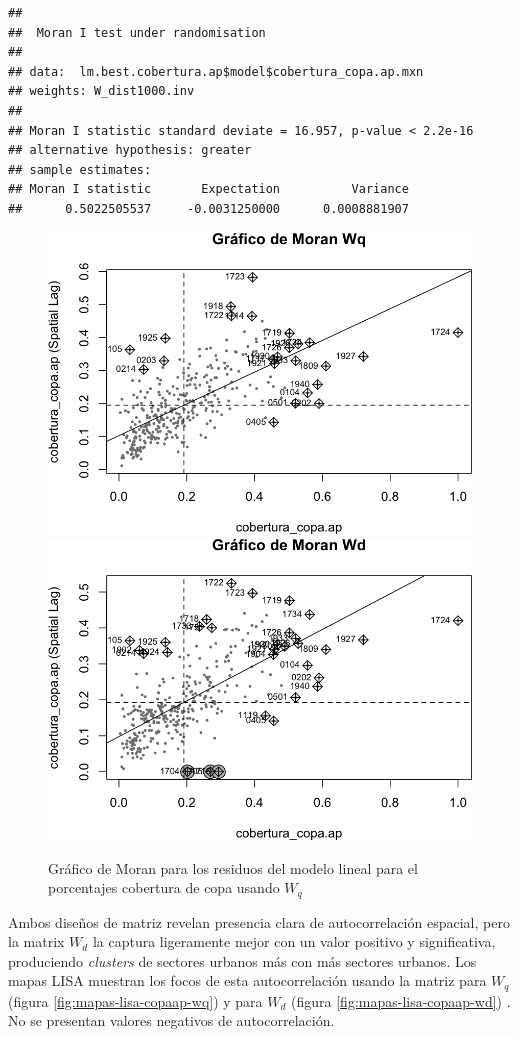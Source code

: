 \documentclass[12pt,]{book}
\begin{document}
\begin{verbatim}
## 
##  Moran I test under randomisation
## 
## data:  lm.best.cobertura.ap$model$cobertura_copa.ap.mxn  
## weights: W_dist1000.inv  
## 
## Moran I statistic standard deviate = 16.957, p-value < 2.2e-16
## alternative hypothesis: greater
## sample estimates:
## Moran I statistic       Expectation          Variance 
##      0.5022505537     -0.0031250000      0.0008881907
\end{verbatim}

\begin{figure}
\includegraphics[width=0.49\linewidth]{tesis-unigis_files/figure-latex/moranplot-copaap-w-1} \includegraphics[width=0.49\linewidth]{tesis-unigis_files/figure-latex/moranplot-copaap-w-2} \caption{Gráfico de Moran para los residuos del modelo lineal para el porcentajes cobertura de copa usando $W_{q}$}\label{fig:moranplot-copaap-w}
\end{figure}

Ambos diseños de matriz revelan presencia clara de autocorrelación
espacial, pero la matrix \(W_d\) la captura ligeramente mejor con un
valor positivo y significativa, produciendo \emph{clusters} de sectores
urbanos más con más sectores urbanos. Los mapas LISA muestran los focos
de esta autocorrelación usando la matriz para \(W_q\) (figura
\ref{fig:mapas-lisa-copaap-wq}) y para \(W_d\) (figura
\ref{fig:mapas-lisa-copaap-wd}) . No se presentan valores negativos de
autocorrelación.
\end{document}
